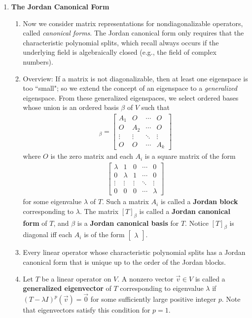 \documentclass[10pt]{article}
\begin{document}
\begin{multicols*}{2}
\begin{enumerate}
    \item \textbf{The Jordan Canonical Form}
    \begin{enumerate}
        \item Now we consider matrix representations for nondiagonalizable operators, called \textit{canonical forms}. The Jordan canonical form only requires that the characteristic polynomial splits, which recall always occurs if the underlying field is algebraically closed (e.g., the field of complex numbers).
        \item Overview: If a matrix is not diagonalizable, then at least one eigenspace is too ``small"; so we extend the concept of an eigenspace to a \textit{generalized} eigenspace. From these generalized eigenspaces, we select ordered bases whose union is an ordered basis $\beta$ of $V$ such that 
        \begin{align*}
            [T]_\beta = 
            \begin{bmatrix}
            A_1 & O & \cdots & O \\
            O & A_2 & \cdots & O \\
            \vdots & \vdots & \ddots & \vdots \\
            O & O & \cdots & A_k
            \end{bmatrix}
        \end{align*}
        where $O$ is the zero matrix and each $A_i$ is a square matrix of the form
        \begin{align*}
            \begin{bmatrix}
            \lambda & 1 & 0 & \cdots & 0 \\
            0 & \lambda & 1 & \cdots & 0 \\
            \vdots & \vdots & \vdots & \ddots & \vdots \\
            0 & 0 & 0 & \cdots & \lambda
            \end{bmatrix}
        \end{align*}
        for some eigenvalue $\lambda$ of $T$. Such a matrix $A_i$ is called a \textbf{Jordan block} corresponding to $\lambda$. The matrix $[T]_\beta$ is called a \textbf{Jordan canonical form} of $T$, and $\beta$ is a \textbf{Jordan canonical basis} for $T$. Notice $[T]_\beta$ is diagonal iff each $A_i$ is of the form $\begin{bmatrix} \lambda \end{bmatrix}$.
        \item Every linear operator whose characteristic polynomial splits has a Jordan canonical form that is unique up to the order of the Jordan blocks.
        \item Let $T$ be a linear operator on $V$. A nonzero vector $\vec{v} \in V$ is called a \textbf{generalized eigenvector} of $T$ corresponding to eigenvalue $\lambda$ if $(T - \lambda I)^p(\vec{v})=\vec{0}$ for some sufficiently large positive integer $p$. Note that eigenvectors satisfy this condition for $p=1$.
        

\end{enumerate}
\end{enumerate}
\end{multicols*}
\end{document}
